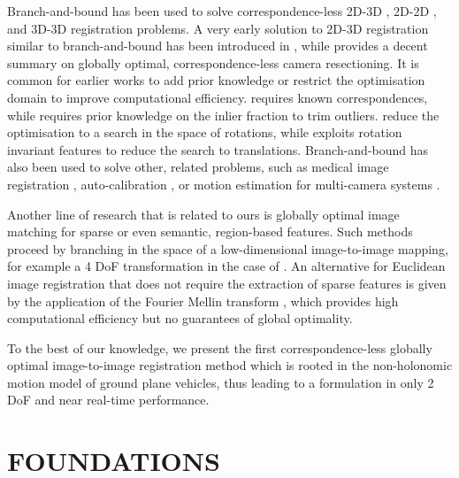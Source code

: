 \documentclass[letterpaper, 10 pt, conference]{ieeeconf}  %
\begin{document}
Branch-and-bound has been used to solve correspondence-less 2D-3D \cite{brown2015globally,brown2019family,liu20182d,campbell2017globally,campbell2018globally,campbell2019alignment}, 2D-2D \cite{hartley2007global,hartley2009global,li2009consensus,neveu2019generic}, and 3D-3D \cite{li20073d,yang2013go,parra2014fast,campbell2016gogma,liu2018efficient} registration problems. A very early solution to 2D-3D registration similar to branch-and-bound has been introduced in \cite{jurie1999solution}, while \cite{brown2019family} provides a decent summary on globally optimal, correspondence-less camera resectioning. It is common for earlier works to add prior knowledge or restrict the optimisation domain to improve computational efficiency. \cite{olsson2008branch} requires known correspondences, while \cite{brown2015globally} requires prior knowledge on the inlier fraction to trim outliers. \cite{li20073d,hartley2007global,parra2014fast,liu20182d} reduce the optimisation to a search in the space of rotations, while \cite{liu2018efficient} exploits rotation invariant features to reduce the search to translations. Branch-and-bound has also been used to solve other, related problems, such as  medical image registration \cite{pfeuffer2012discrete}, auto-calibration \cite{paudel2018sampling}, or motion estimation for multi-camera systems \cite{kim2008motion}.

Another line of research that is related to ours is globally optimal image matching for sparse \cite{mount1999efficient,breuel2003implementation,bazin2012branch} or even semantic, region-based \cite{speciale2018consensus} features. Such methods proceed by branching in the space of a low-dimensional image-to-image mapping, for example a 4 DoF transformation in the case of \cite{breuel2003implementation}. An alternative for Euclidean image registration that does not require the extraction of sparse features is given by the application of the Fourier Mellin transform \cite{guo05,bulow2009}, which provides high computational efficiency but no guarantees of global optimality.

To the best of our knowledge, we present the first correspondence-less globally optimal image-to-image registration method which is rooted in the non-holonomic motion model of ground plane vehicles, thus leading to a formulation in only 2 DoF and near real-time performance.


\section{FOUNDATIONS}
\label{sec:foundations}
\end{document}

